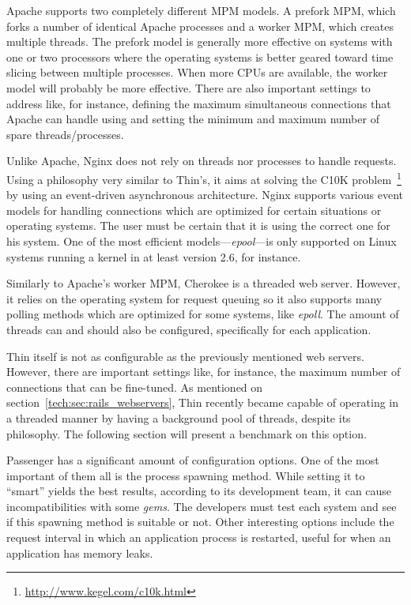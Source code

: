 Apache supports two completely different MPM models. A prefork MPM, which forks a number of identical Apache processes and a worker MPM, which creates multiple threads. The prefork model is generally more effective on systems with one or two processors where the operating systems is better geared toward time slicing between multiple processes. When more CPUs are available, the worker model will probably be more effective. There are also important settings to address like, for instance, defining the maximum simultaneous connections that Apache can handle using  and setting the minimum and maximum number of spare threads/processes.

Unlike Apache, Nginx does not rely on threads nor processes to handle requests. Using a philosophy very similar to Thin's, it aims at solving the C10K problem~\footnote{\url{http://www.kegel.com/c10k.html}} by using an event-driven asynchronous architecture. Nginx supports various event models for handling connections which are optimized for certain situations or operating systems. The user must be certain that it is using the correct one for his system. One of the most efficient models---\textit{epool}---is only supported on Linux systems running a kernel in at least version 2.6, for instance.

Similarly to Apache's worker MPM, Cherokee is a threaded web server. However, it relies on the operating system for request queuing so it also supports many polling methods which are optimized for some systems, like \textit{epoll}. The amount of threads can and should also be configured, specifically for each application.

Thin itself is not as configurable as the previously mentioned web servers. However, there are important settings like, for instance, the maximum number of connections that can be fine-tuned. As mentioned on section~\ref{tech:sec:rails_webservers}, Thin recently became capable of operating in a threaded manner by having a background pool of threads, despite its philosophy. The following section will present a benchmark on this option.

Passenger has a significant amount of configuration options. One of the most important of them all is the process spawning method. While setting it to ``smart'' yields the best results, according to its development team, it can cause incompatibilities with some \textit{gems}. The developers must test each system and see if this spawning method is suitable or not. Other interesting options include the request interval in which an application process is restarted, useful for when an application has memory leaks.


